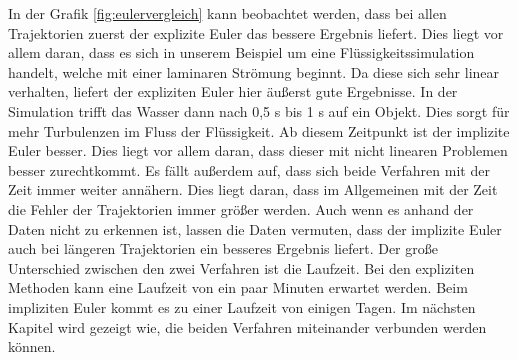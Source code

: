 In der Grafik \ref{fig:eulervergleich} kann beobachtet werden, dass bei allen Trajektorien zuerst der explizite Euler das bessere Ergebnis liefert.
Dies liegt vor allem daran, dass es sich in unserem Beispiel 
um eine Flüssigkeitssimulation handelt, welche mit einer laminaren Strömung beginnt.
Da diese sich sehr linear verhalten, liefert der expliziten 
Euler hier äußerst gute Ergebnisse.
In der Simulation trifft das Wasser dann nach 0,5 s bis 1 s
auf ein Objekt.
Dies sorgt für mehr Turbulenzen im Fluss der Flüssigkeit.
Ab diesem Zeitpunkt ist der implizite Euler besser.
Dies liegt vor allem daran, dass dieser mit nicht linearen Problemen besser zurechtkommt.
Es fällt außerdem auf, dass sich beide Verfahren mit der Zeit
immer weiter annähern.
Dies liegt daran, dass im Allgemeinen mit der Zeit die Fehler der
Trajektorien immer größer werden.
Auch wenn es anhand der Daten nicht zu erkennen ist,
lassen die Daten vermuten, dass der implizite Euler auch bei längeren Trajektorien ein besseres Ergebnis liefert.
Der große Unterschied zwischen den zwei Verfahren ist die Laufzeit.
Bei den expliziten Methoden kann eine Laufzeit von ein paar Minuten 
erwartet werden. Beim impliziten Euler kommt es zu einer Laufzeit von einigen Tagen. 
Im nächsten Kapitel wird gezeigt wie, die beiden Verfahren miteinander 
verbunden werden können.

